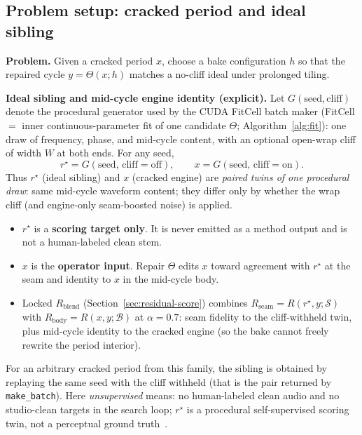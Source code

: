 \subsection{Problem setup: cracked period and ideal sibling}
\label{sec:ideal-tile}

\textbf{Problem.} Given a cracked period $x$, choose a bake configuration $h$ so that the repaired cycle $y=\Theta(x;h)$ matches a no-cliff ideal under prolonged tiling.

\textbf{Ideal sibling and mid-cycle engine identity (explicit).}
Let $G(\mathrm{seed},\mathrm{cliff})$ denote the procedural generator used by the CUDA FitCell batch maker
(FitCell $=$ inner continuous-parameter fit of one candidate $\Theta$; Algorithm~\ref{alg:fit}):
one draw of frequency, phase, and mid-cycle content, with an optional open-wrap cliff of width $W$ at both ends.
For any seed,
\begin{equation}
\label{eq:G-siblings}
r^{\star}=G(\mathrm{seed},\,\mathrm{cliff{=}off}),\qquad
x=G(\mathrm{seed},\,\mathrm{cliff{=}on}).
\end{equation}
Thus $r^{\star}$ (ideal sibling) and $x$ (cracked engine) are \emph{paired twins of one procedural draw}:
same mid-cycle waveform content; they differ only by whether the wrap cliff (and engine-only seam-boosted noise) is applied.
\begin{itemize}
  \item $r^{\star}$ is a \textbf{scoring target only}. It is never emitted as a method output and is not a human-labeled clean stem.
  \item $x$ is the \textbf{operator input}. Repair $\Theta$ edits $x$ toward agreement with $r^{\star}$ at the seam and identity to $x$ in the mid-cycle body.
  \item Locked $R_{\mathrm{blend}}$ (Section~\ref{sec:residual-score}) combines $R_{\mathrm{seam}}=R(r^{\star},y;\mathcal{S})$ with $R_{\mathrm{body}}=R(x,y;\mathcal{B})$ at $\alpha{=}0.7$:
    seam fidelity to the cliff-withheld twin, plus mid-cycle identity to the cracked engine (so the bake cannot freely rewrite the period interior).
\end{itemize}
For an arbitrary cracked period from this family, the sibling is obtained by replaying the same seed with the cliff withheld
(that is the pair returned by \texttt{make\_batch}).
Here \emph{unsupervised} means: no human-labeled clean audio and no studio-clean targets in the search loop;
$r^{\star}$ is a procedural self-supervised scoring twin, not a perceptual ground truth~\cite{lehtinen2018,kashyap2021n2n}.


